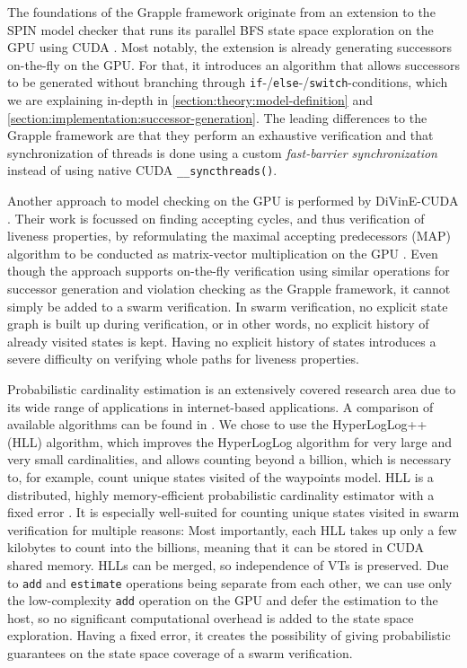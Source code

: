 \documentclass[
fancyheadings, %
%
%
]{stsreprt}
\begin{document}
The foundations of the Grapple framework originate from an extension to the SPIN model checker that runs its parallel BFS state space exploration \cite{Holzmann2012.Paralellizing-SPIN} on the GPU using CUDA \cite{Bartocci2014.GPGPU-Parallel-SPIN}.
Most notably, the extension is already generating successors on-the-fly on the GPU.
For that, it introduces an algorithm that allows successors to be generated without branching through \texttt{if}-/\texttt{else}-/\texttt{switch}-conditions, which we are explaining in-depth in \cref{section:theory:model-definition} and \cref{section:implementation:successor-generation}.
The leading differences to the Grapple framework are that they perform an exhaustive verification and that synchronization of threads is done using a custom \emph{fast-barrier synchronization} instead of using native CUDA \texttt{\_\_syncthreads()}.

Another approach to model checking on the GPU is performed by DiVinE-CUDA \cite{Barnat2009.DiVinE-CUDA}.
Their work is focussed on finding accepting cycles, and thus verification of liveness properties, by reformulating the maximal accepting predecessors (MAP) algorithm to be conducted as matrix-vector multiplication on the GPU \cite{Barnat2009}.
Even though the approach supports on-the-fly verification using similar operations for successor generation and violation checking as the Grapple framework, it cannot simply be added to a swarm verification.
In swarm verification, no explicit state graph is built up during verification, or in other words, no explicit history of already visited states is kept.
Having no explicit history of states introduces a severe difficulty on verifying whole paths for liveness properties.


Probabilistic cardinality estimation is an extensively covered research area due to its wide range of applications in internet-based applications.
A comparison of available algorithms can be found in \cite{Metwally2008}.
We chose to use the HyperLogLog++ (HLL) algorithm, which improves the HyperLogLog algorithm \cite{Flajolet2007.HyperLogLog} for very large and very small cardinalities, and allows counting beyond a billion, which is necessary to, for example, count unique states visited of the waypoints model.
HLL is a distributed, highly memory-efficient probabilistic cardinality estimator with a fixed error \cite{Heule2013.HyperLogLog++}.
It is especially well-suited for counting unique states visited in swarm verification for multiple reasons:
Most importantly, each HLL takes up only a few kilobytes to count into the billions, meaning that it can be stored in CUDA shared memory.
HLLs can be merged, so independence of VTs is preserved.
Due to \texttt{add} and \texttt{estimate} operations being separate from each other, we can use only the low-complexity \texttt{add} operation on the GPU and defer the estimation to the host, so no significant computational overhead is added to the state space exploration.
Having a fixed error, it creates the possibility of giving probabilistic guarantees on the state space coverage of a swarm verification.
\end{document}
